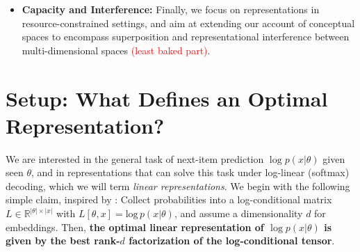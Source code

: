 \documentclass[11pt]{article}
\begin{document}
\begin{itemize}
    \item \textbf{Capacity and Interference:} Finally, we focus on representations in resource-constrained settings, and aim at extending our account of conceptual spaces to encompass superposition and representational interference between multi-dimensional spaces \textcolor{red}{(least baked part)}.
\end{itemize} 





\section{Setup: What Defines an Optimal Representation?}

We are interested in the general task of next-item prediction $\log p(x| \theta)$ given seen $\theta$, and in representations that can solve this task under log-linear (softmax) decoding, which we will term \textit{linear representations}. We begin with the following simple claim, inspired by \citet{levy2014neural}:  Collect probabilities into a log-conditional matrix $L \in \mathbb{R}^{|\theta|\times|x|}$ with $L[\theta,x] = \mbox{log}\,p(x|\theta)$, and assume a dimensionality $d$ for embeddings. Then, \textbf{the optimal linear representation of $\log p(x| \theta)$ is given by the best rank-$d$ factorization of the log-conditional tensor}.
\end{document}
